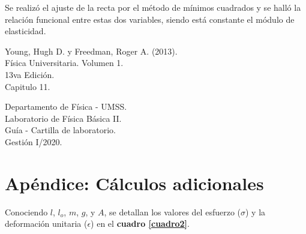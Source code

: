 \documentclass[letter,11pt]{article}
\begin{document}
Se realizó el ajuste de la recta por el método de mínimos cuadrados y se halló
la relación funcional entre estas dos variables, siendo está constante el
módulo de elasticidad.

\begin{thebibliography}{99}

 Young, Hugh D. y Freedman, Roger A. (2013).\\
Física Universitaria. Volumen 1.\\
13va Edición.\\
Capitulo 11.

 Departamento de Física - UMSS.\\
Laboratorio de Física Básica II.\\
Guía - Cartilla de laboratorio.\\
Gestión I/2020.

\end{thebibliography}

\newpage
\section*{Apéndice: Cálculos adicionales}

Conociendo $l$, $l_o$, $m$, $g$, y $A$, se detallan los valores del esfuerzo
($\sigma$) y la deformación unitaria ($\epsilon$) en el
\textbf{cuadro \ref{cuadro2}}.
\end{document}
